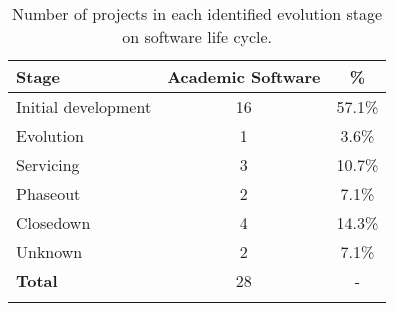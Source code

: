\begin{table}[htb]
  \caption{Number of projects in each identified evolution stage on software life cycle.}
  \centering
  \begin{tabular}{l c c}
    \hline
    {\bf Stage} & {\bf Academic Software} & {\bf \%} \\
    \hline
    Initial development & 16 & 57.1\% \\
    Evolution & 1 & 3.6\% \\
    Servicing & 3 & 10.7\% \\
    Phaseout & 2 & 7.1\% \\
    Closedown & 4 & 14.3\% \\
    Unknown & 2 & 7.1\% \\
    \hline
      {\bf Total}         & 28 & - \\
    \hline
    \label{life-cycle-table}
  \end{tabular}
\end{table}
